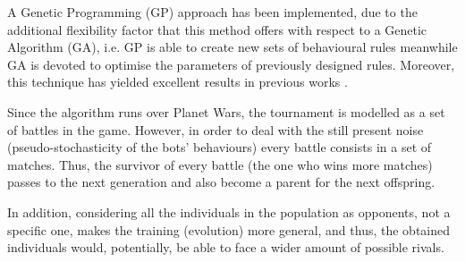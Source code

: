 \documentclass[conference]{IEEEtran}
\begin{document}
A Genetic Programming (GP) \cite{GP_Koza92} approach has been implemented, due to the additional flexibility factor that this method offers with respect to a Genetic Algorithm (GA), i.e. GP is able to create new sets of behavioural rules meanwhile GA is devoted to optimise the parameters of previously designed rules. Moreover, this technique has yielded excellent results in previous works \cite{GarciaGP14,EsparciaGP2013}.


Since the algorithm runs over Planet Wars, the tournament is modelled as a set of battles in the game. However, in order to deal with the still present noise (pseudo-stochasticity of the bots' behaviours) every battle consists in a set of matches.
Thus, the survivor of every battle (the one who wins more matches)
passes to the next generation and also become a parent for the next
offspring.


In addition,  considering all the individuals in the population as opponents, not a specific one, makes the training (evolution) more
general, and thus, the obtained individuals would, potentially, be able to face a wider amount of possible rivals.


\end{document}
